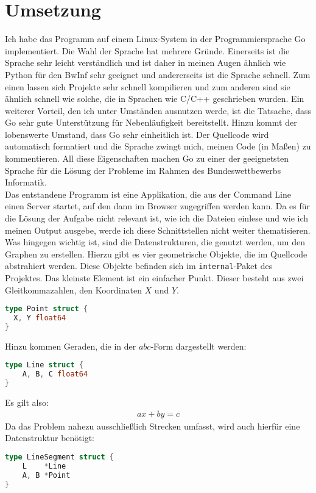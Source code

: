 \documentclass[a4paper,10pt,ngerman]{scrartcl}
\begin{document}
\section{Umsetzung}
Ich habe das Programm auf einem Linux-System in der Programmiersprache Go implementiert. Die Wahl der Sprache hat mehrere Gründe. Einerseits ist die Sprache sehr leicht verständlich und ist daher in meinen Augen ähnlich wie Python für den BwInf sehr geeignet und andererseits ist die Sprache schnell. Zum einen lassen sich Projekte sehr schnell kompilieren und zum anderen sind sie ähnlich schnell wie solche, die in Sprachen wie C/C++ geschrieben wurden. Ein weiterer Vorteil, den ich unter Umständen ausnutzen werde, ist die Tatsache, dass Go sehr gute Unterstützung für Nebenläufigkeit bereitstellt. Hinzu kommt der lobenswerte Umstand, dass Go sehr einheitlich ist. Der Quellcode wird automatisch formatiert und die Sprache zwingt mich, meinen Code (in Maßen) zu kommentieren. All diese Eigenschaften machen Go zu einer der geeignetsten Sprache für die Lösung der Probleme im Rahmen des Bundeswettbewerbs Informatik.\\
Das entstandene Programm ist eine Applikation, die aus der Command Line einen Server startet, auf den dann im Browser zugegriffen werden kann. Da es für die Lösung der Aufgabe nicht relevant ist, wie ich die Dateien einlese und wie ich meinen Output ausgebe, werde ich diese Schnittstellen nicht weiter thematisieren.\\
Was hingegen wichtig ist, sind die Datenstrukturen, die genutzt werden, um den Graphen zu erstellen. Hierzu gibt es vier geometrische Objekte, die im Quellcode abstrahiert werden. Diese Objekte befinden sich im \texttt{internal}-Paket des Projektes. Das kleinste Element ist ein einfacher Punkt. Dieser besteht aus zwei Gleitkommazahlen, den Koordinaten $X$ und $Y$.
\begin{lstlisting}[language=Go]
type Point struct {
  X, Y float64
}
\end{lstlisting}
Hinzu kommen Geraden, die in der $abc$-Form dargestellt werden:
\begin{lstlisting}[language=Go]
type Line struct {
	A, B, C float64
}
\end{lstlisting}
Es gilt also:
\begin{align}
  ax + by = c 
\end{align}
Da das Problem nahezu ausschlie\ss lich Strecken umfasst, wird auch hierfür eine Datenstruktur benötigt:
\begin{lstlisting}[language=Go]
type LineSegment struct {
	L    *Line
	A, B *Point
} 
\end{lstlisting}
\end{document}
